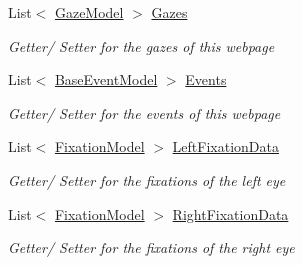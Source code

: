 \begin{DoxyCompactItemize}
List$<$ \hyperlink{class_web_analyzer_1_1_models_1_1_data_model_1_1_gaze_model}{Gaze\+Model} $>$ \hyperlink{class_web_analyzer_1_1_models_1_1_data_model_1_1_webpage_model_acb4a6ecac0e4ef9ed2df7b33e4694b31}{Gazes}
\begin{DoxyCompactList}\small\item\em Getter/ Setter for the gazes of this webpage \end{DoxyCompactList}\item 
List$<$ \hyperlink{class_web_analyzer_1_1_models_1_1_event_model_1_1_base_event_model}{Base\+Event\+Model} $>$ \hyperlink{class_web_analyzer_1_1_models_1_1_data_model_1_1_webpage_model_aa80b98da4b9e9c2d6b6950f4e52c0b61}{Events}
\begin{DoxyCompactList}\small\item\em Getter/ Setter for the events of this webpage \end{DoxyCompactList}\item 
List$<$ \hyperlink{class_web_analyzer_1_1_models_1_1_analysis_model_1_1_fixation_model}{Fixation\+Model} $>$ \hyperlink{class_web_analyzer_1_1_models_1_1_data_model_1_1_webpage_model_af4888add7ed76fe7b841410abc944b99}{Left\+Fixation\+Data}
\begin{DoxyCompactList}\small\item\em Getter/ Setter for the fixations of the left eye \end{DoxyCompactList}\item 
List$<$ \hyperlink{class_web_analyzer_1_1_models_1_1_analysis_model_1_1_fixation_model}{Fixation\+Model} $>$ \hyperlink{class_web_analyzer_1_1_models_1_1_data_model_1_1_webpage_model_abe8cc7ad2f30655dbd1ba0c1111429d6}{Right\+Fixation\+Data}
\begin{DoxyCompactList}\small\item\em Getter/ Setter for the fixations of the right eye \end{DoxyCompactList}\end{DoxyCompactItemize}

